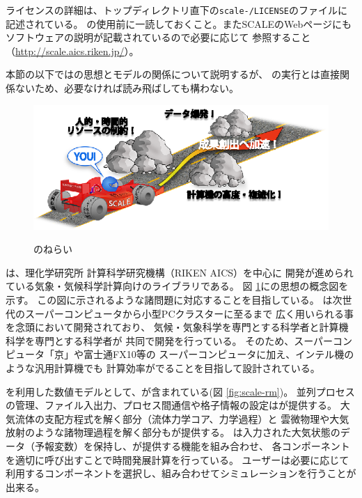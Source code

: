 ライセンスの詳細は、トップディレクトリ直下の\texttt{scale-\version/LICENSE}のファイルに記述されている。
\scalelib の使用前に一読しておくこと。またSCALEのWebページにもソフトウェアの説明が記載されているので必要に応じて
参照すること（\url{http://scale.aics.riken.jp/}）。

本節の以下では\scalelib の思想とモデルの関係について説明するが、
\scalerm の実行とは直接関係ないため、必要なければ読み飛ばしても構わない。


\begin{figure}[htb]
\begin{center}
  \includegraphics[width=0.9\hsize]{./figure/library.eps}\\
  \caption{\scalelib のねらい}
  \label{fig:scale}
\end{center}
\end{figure}

\scalelib は、理化学研究所 計算科学研究機構（RIKEN AICS）を中心に
開発が進められている気象・気候科学計算向けのライブラリである。
図 \ref{fig:scale}に\scalelib の思想の概念図を示す。
この図に示されるような諸問題に対応することを目指している。
\scalelib は次世代のスーパーコンピュータから小型PCクラスターに至るまで
広く用いられる事を念頭において開発されており、
気候・気象科学を専門とする科学者と計算機科学を専門とする科学者が
共同で開発を行っている。
そのため、スーパーコンピュータ「京」や富士通FX10等の
スーパーコンピュータに加え、インテル機のような汎用計算機でも
計算効率がでることを目指して設計されている。

\scalelib を利用した数値モデルとして、\scalerm が含まれている(図 \ref{fig:scale-rm})。
並列プロセスの管理、ファイル入出力、プロセス間通信や格子情報の設定は\scalelib が提供する。
大気流体の支配方程式を解く部分（流体力学コア、力学過程）と
雲微物理や大気放射のような諸物理過程を解く部分も\scalelib が提供する。
\scalerm は入力された大気状態のデータ（予報変数）を保持し、\scalelib が提供する機能を組み合わせ、
各コンポーネントを適切に呼び出すことで時間発展計算を行っている。
ユーザーは必要に応じて利用するコンポーネントを選択し、組み合わせてシミュレーションを行うことが出来る。

